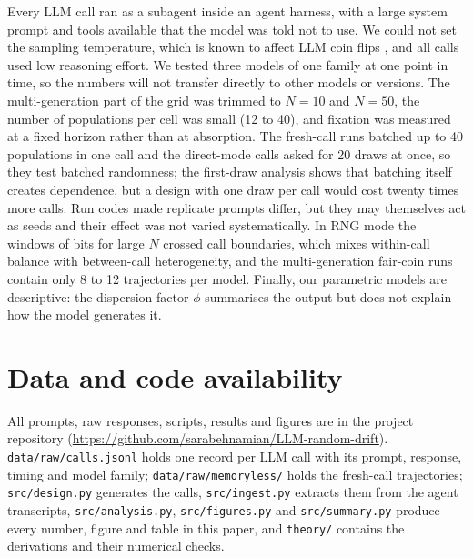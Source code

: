 \documentclass[11pt,a4paper]{article}
\begin{document}
Every LLM call ran as a subagent inside an agent harness, with a large system prompt and tools available that the model was told not to use.
We could not set the sampling temperature, which is known to affect LLM coin flips \citep{koevering2024random}, and all calls used low reasoning effort.
We tested three models of one family at one point in time, so the numbers will not transfer directly to other models or versions.
The multi-generation part of the grid was trimmed to $N=10$ and $N=50$, the number of populations per cell was small (12 to 40), and fixation was measured at a fixed horizon rather than at absorption.
The fresh-call runs batched up to 40 populations in one call and the direct-mode calls asked for 20 draws at once, so they test batched randomness; the first-draw analysis shows that batching itself creates dependence, but a design with one draw per call would cost twenty times more calls.
Run codes made replicate prompts differ, but they may themselves act as seeds and their effect was not varied systematically.
In RNG mode the windows of bits for large $N$ crossed call boundaries, which mixes within-call balance with between-call heterogeneity, and the multi-generation fair-coin runs contain only 8 to 12 trajectories per model.
Finally, our parametric models are descriptive: the dispersion factor $\phi$ summarises the output but does not explain how the model generates it.

\section*{Data and code availability}
All prompts, raw responses, scripts, results and figures are in the project repository (\url{https://github.com/sarabehnamian/LLM-random-drift}).
\texttt{data/raw/calls.jsonl} holds one record per LLM call with its prompt, response, timing and model family; \texttt{data/raw/memoryless/} holds the fresh-call trajectories; \texttt{src/design.py} generates the calls, \texttt{src/ingest.py} extracts them from the agent transcripts, \texttt{src/analysis.py}, \texttt{src/figures.py} and \texttt{src/summary.py} produce every number, figure and table in this paper, and \texttt{theory/} contains the derivations and their numerical checks.



\end{document}
